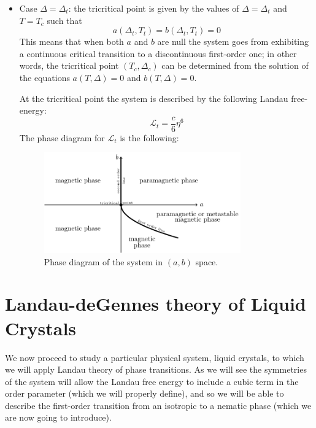 \documentclass[../../Main/Main.tex]{subfiles}
\begin{document}
\begin{itemize}
\item Case \( \Delta = \Delta _t  \): the tricritical point is given by the values of \( \Delta = \Delta _t \)  and \( T= T_c \) such that
\begin{equation*}
  a (\Delta _t, T_t) = b (\Delta _t, T_t) = 0
\end{equation*}
 This means that when both \( a \) and \( b \) are null the system goes from exhibiting a continuous critical transition to a discontinuous first-order one; in other words, the tricritical point \( (T_{c},\Delta _{c}) \)  can be determined from the solution of the equations \( a(T,\Delta )=0 \) and \(b(T,\Delta )=0  \).

At the tricritical point the system is described by the following Landau free-energy:
\begin{equation*}
  \mathcal{L}_t = \frac{c}{6} \eta ^6
\end{equation*}
The phase diagram for $\mathcal{L}_t$ is the following:

\begin{figure}[H]
\centering
\includegraphics[width=0.8\textwidth]{./img/8.png}
\caption{\label{fig:16_8} Phase diagram of the system in  \( (a,b) \) space.}
\end{figure}


\end{itemize}

\section{Landau-deGennes theory of Liquid Crystals}
We now proceed to study a particular physical system, liquid crystals, to which we will apply Landau theory of phase transitions. As we will see the symmetries of the system will allow the Landau free energy to include a cubic term in the order parameter (which we will properly define), and so we will be able to describe the first-order transition from an isotropic to a nematic phase (which we are now going to introduce).
\end{document}
